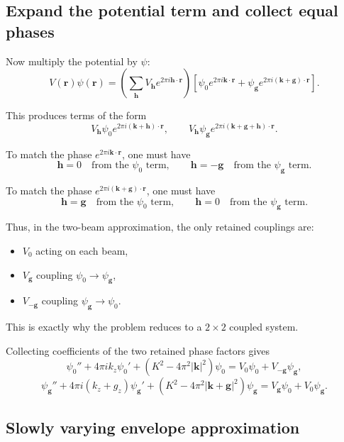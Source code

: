 \documentclass[11pt]{article}
\begin{document}
\subsection*{Expand the potential term and collect equal phases}

Now multiply the potential by \(\psi\):
\[
V(\mathbf r)\psi(\mathbf r)
=
\left(\sum_{\mathbf h} V_{\mathbf h} e^{2\pi i \mathbf h\cdot \mathbf r}\right)
\left[
\psi_0 e^{2\pi i \mathbf k\cdot \mathbf r}
+
\psi_{\mathbf g} e^{2\pi i (\mathbf k+\mathbf g)\cdot \mathbf r}
\right].
\]

This produces terms of the form
\[
V_{\mathbf h}\psi_0 e^{2\pi i (\mathbf k+\mathbf h)\cdot \mathbf r},
\qquad
V_{\mathbf h}\psi_{\mathbf g} e^{2\pi i (\mathbf k+\mathbf g+\mathbf h)\cdot \mathbf r}.
\]

To match the phase \(e^{2\pi i \mathbf k\cdot \mathbf r}\), one must have
\[
\mathbf h=0 \quad \text{from the \(\psi_0\) term},
\qquad
\mathbf h=-\mathbf g \quad \text{from the \(\psi_{\mathbf g}\) term}.
\]

To match the phase \(e^{2\pi i (\mathbf k+\mathbf g)\cdot \mathbf r}\), one must have
\[
\mathbf h=\mathbf g \quad \text{from the \(\psi_0\) term},
\qquad
\mathbf h=0 \quad \text{from the \(\psi_{\mathbf g}\) term}.
\]

Thus, in the two-beam approximation, the only retained couplings are:
\begin{itemize}
    \item \(V_0\) acting on each beam,
    \item \(V_{\mathbf g}\) coupling \(\psi_0 \to \psi_{\mathbf g}\),
    \item \(V_{-\mathbf g}\) coupling \(\psi_{\mathbf g} \to \psi_0\).
\end{itemize}

This is exactly why the problem reduces to a \(2\times 2\) coupled system.

Collecting coefficients of the two retained phase factors gives
\[
\psi_0''+4\pi i k_z \psi_0'
+
\left(K^2-4\pi^2|\mathbf k|^2\right)\psi_0
=
V_0 \psi_0 + V_{-\mathbf g} \psi_{\mathbf g},
\]
\[
\psi_{\mathbf g}''+4\pi i (k_z+g_z) \psi_{\mathbf g}'
+
\left(K^2-4\pi^2|\mathbf k+\mathbf g|^2\right)\psi_{\mathbf g}
=
V_{\mathbf g} \psi_0 + V_0 \psi_{\mathbf g}.
\]

\subsection*{Slowly varying envelope approximation}
\end{document}
